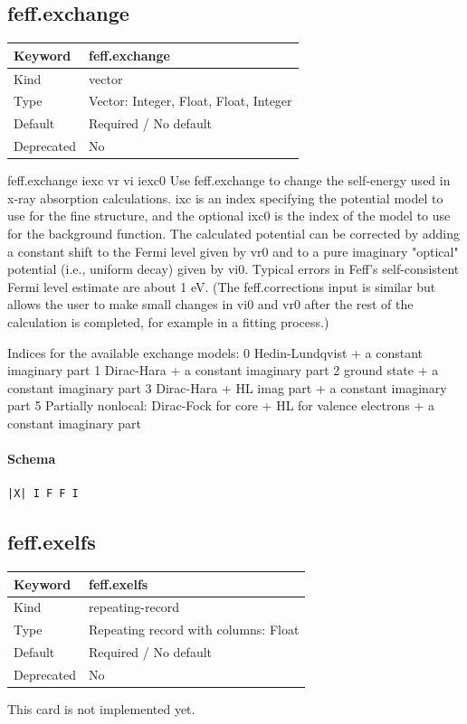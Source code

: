 \documentclass[11pt]{article}
\begin{document}
{{{\subsection{feff.exchange}
\label{kw:feff-exchange}
\begin{longtable}{|p{1.5in}|p{4.5in}|}
\hline
Keyword & feff.exchange \\
\hline
Kind & vector \\
\hline
Type & Vector: Integer, Float, Float, Integer \\
\hline
Default & Required / No default \\
\hline
Deprecated & No \\
\hline
\end{longtable}
 feff.exchange{ iexc vr vi iexc0 }
 Use feff.exchange to change the self-energy used in x-ray absorption
 calculations. ixc is an index specifying the potential model to use for the
 fine structure, and the optional ixc0 is the index of the model to use for
 the background function. The calculated potential can be corrected by adding
 a constant shift to the Fermi level given by vr0 and to a pure imaginary
 "optical" potential (i.e., uniform decay) given by vi0. Typical errors in
 Feff's self-consistent Fermi level estimate are about 1 eV.
 (The feff.corrections input is similar but allows the user to make small
 changes in vi0 and vr0 after the rest of the calculation is completed, for
 example in a fitting process.)

 Indices for the available exchange models:
   0 Hedin-Lundqvist + a constant imaginary part
   1 Dirac-Hara + a constant imaginary part
   2 ground state + a constant imaginary part
   3 Dirac-Hara + HL imag part + a constant imaginary part
   5 Partially nonlocal: Dirac-Fock for core + HL for valence electrons + a
     constant imaginary part

\paragraph{Schema}
\begin{Verbatim}
|X| I F F I
\end{Verbatim}

\subsection{feff.exelfs}
\label{kw:feff-exelfs}
\begin{longtable}{|p{1.5in}|p{4.5in}|}
\hline
Keyword & feff.exelfs \\
\hline
Kind & repeating-record \\
\hline
Type & Repeating record with columns: Float \\
\hline
Default & Required / No default \\
\hline
Deprecated & No \\
\hline
\end{longtable}
 This card is not implemented yet.

}}}
\end{document}
